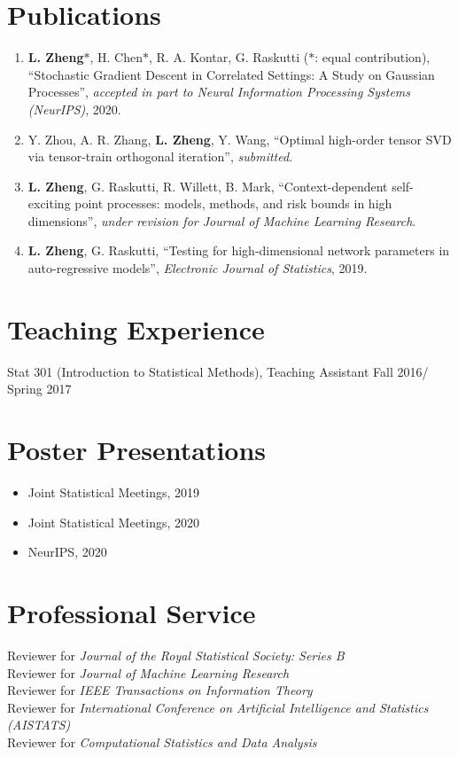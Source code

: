 \documentclass[letterpaper,11pt]{article}
\begin{document}
	\section{Publications}
	\begin{enumerate}
		\item {\bf L. Zheng}$*$, H. Chen$*$, R. A. Kontar, G. Raskutti ($*$: equal contribution), ``Stochastic Gradient Descent in Correlated Settings: A Study on Gaussian Processes'', {\em accepted in part to Neural Information Processing Systems (NeurIPS)}, 2020.%
		\item Y. Zhou, A. R. Zhang, {\bf L. Zheng}, Y. Wang, ``Optimal high-order tensor SVD via tensor-train orthogonal
			iteration'', {\em  submitted}.
		\item {\bf L. Zheng}, G. Raskutti, R. Willett, B. Mark, ``Context-dependent self-exciting point processes: models, methods, and risk bounds in high dimensions'', {\em under revision for Journal of Machine Learning Research}.    
		\item {\bf L. Zheng}, G. Raskutti, ``Testing for high-dimensional network parameters in auto-regressive models'', {\em Electronic Journal of Statistics}, 2019.
	\end{enumerate}
	
	
	\section{Teaching Experience}
	Stat 301 (Introduction to Statistical Methods), Teaching Assistant \hfill Fall 2016/ Spring 2017
	\section{Poster Presentations}
	\begin{itemize}
		\item Joint Statistical Meetings, 2019 
		\item Joint Statistical Meetings, 2020
		\item NeurIPS, 2020
	\end{itemize}
	\section{Professional Service}
	Reviewer for {\em Journal of the Royal Statistical Society: Series B} \\
	Reviewer for {\em Journal of Machine Learning Research} \\
	Reviewer for {\em IEEE Transactions on Information Theory}\\
	Reviewer for {\em International Conference on Artificial Intelligence and Statistics (AISTATS)}\\
	Reviewer for {\em Computational Statistics and Data Analysis}
\end{document}
